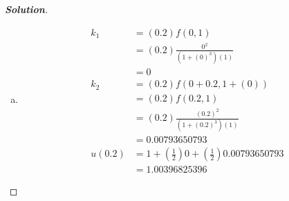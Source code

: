 \documentclass[11pt]{article}
\newenvironment{solution}{%
  \begin{proof}[\textbf{Solution}]$ $\par\nobreak\ignorespaces
}{%
  \end{proof}
}
\theoremstyle{definition}
\begin{document}
\begin{solution}
\begin{enumerate}[(a)]
\begin{align*}
        &= (0.2) (2.4 + 0.2) \\
        &= 0.52 \\
        u(0.2) &= 2 + (\frac{1}{2})0.4 + (\frac{1}{2})0.52 \\
        &= 2.46
    \end{align*}
    \item
    \begin{align*}
        k_1 &= (0.2) f(0, 1) \\
        &= (0.2) \frac{0^2}{(1 + (0)^3)(1)} \\
        &= 0 \\
        k_2 &= (0.2) f(0 + 0.2, 1 + (0)) \\
        &= (0.2) f(0.2, 1) \\
        &= (0.2) \frac{(0.2)^2}{(1 + (0.2)^3)(1)} \\
        &= 0.00793650793 \\
        u(0.2) &= 1 + (\frac{1}{2})0 + (\frac{1}{2})0.00793650793 \\
        &= 1.00396825396
    \end{align*}
\end{enumerate}
\end{solution}
\end{document}
